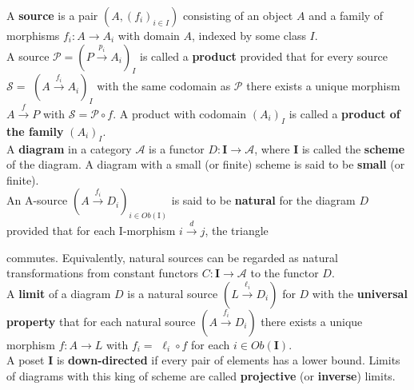    

A \textbf{source} is a pair $\left(A,\left(f_i\right)_{i \in I}\right)$ consisting of an object $A$ and a family of morphisms $f_i: A \rightarrow A_i$ with domain $A$, indexed by some class $I$.\\
A source $\mathcal{P}=\left(P \xrightarrow{p_i} A_i\right)_I$ is called a \textbf{product} provided that for every source $\mathcal{S}=$ $\left(A \xrightarrow{f_i} A_i\right)_I$ with the same codomain as $\mathcal{P}$ there exists a unique morphism $A \xrightarrow{f} P$ with $\mathcal{S}=\mathcal{P} \circ f$. A product with codomain $\left(A_i\right)_I$ is called a \textbf{product of the family} $\left(A_i\right)_I$.\\

 A \textbf{diagram} in a category $\mathcal{A}$ is a functor $D: \mathbf{I} \rightarrow \mathcal{A}$, where $\mathbf{I}$ is called the \textbf{scheme} of the diagram. A diagram with a small (or finite) scheme is said to be \textbf{small} (or finite).\\
An A-source $\left(A \xrightarrow{f_i} D_i\right)_{i \in O b(\mathrm{I})}$ is said to be \textbf{natural} for the diagram $D$ provided that for each I-morphism $i \xrightarrow{d} j$, the triangle 
 commutes. Equivalently, natural sources can be regarded as natural transformations from constant functors $C: \mathbf{I} \rightarrow \mathcal{A}$ to the functor $D$.\\
A \textbf{limit} of a diagram $D$ is a natural source $\left(L \xrightarrow{\ell_i} D_i\right)$ for $D$ with the \textbf{universal property} that for each natural source $\left(A \xrightarrow{f_i} D_i\right)$ there exists a unique morphism $f: A \rightarrow L$ with $f_i=$ $\ell_i \circ f$ for each $i \in O b(\mathbf{I})$.\\
 A poset $\mathbf{I}$ is \textbf{down-directed} if every pair of elements has a lower bound. Limits of diagrams with this king of scheme are called \textbf{projective} (or \textbf{inverse}) limits. 


